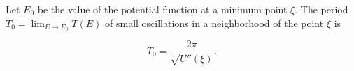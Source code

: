Let $E_0$ be the value of the potential function at a minimum point $\xi$. The period $T_0 = \lim_{E \to E_0} T(E)$ of small oscillations in a neighborhood of the point $\xi$ is

$$T_0 = \frac{2\pi}{\sqrt{U''(\xi)}}.$$
